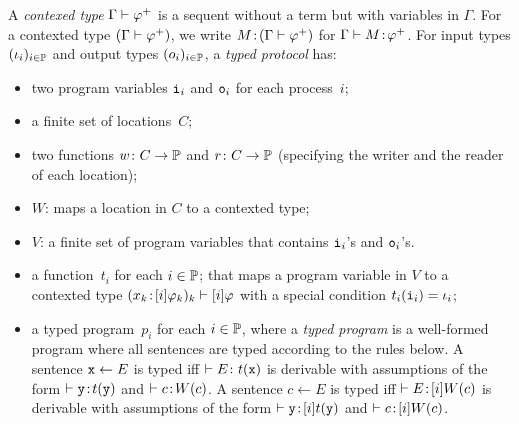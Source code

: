 A \textit{contexed type}
 $\Gamma\vdash{\varphi}^+$ is a sequent without a term but with variables in
 $\Gamma$.
For a contexted type $(\Gamma\vdash{\varphi}^+)$,
we write ${M} \mathord{\colon\kern -2pt}{(\Gamma\vdash{\varphi}^+)}$ for
$\Gamma\vdash{M} \mathord{\colon\kern -2pt}{{\varphi}^+}$.
For input types $(\iota_i)_{i\in\mathbb{P}}$
and output types $(o_i)_{i\in\mathbb{P}}$,
a \textit{typed protocol} has:
\begin{itemize}
 \item two program variables
      $\texttt{i}_i$ and $\texttt{o}_i$ for each process~$i$;
 \item a finite set of locations~$C$;
 \item two functions $w\colon C\rightarrow \mathbb{P}$
       and $r\colon C\rightarrow
       \mathbb{P}$ (specifying the writer and the reader of
       each location);
 \item $W$: maps a location in $C$ to a contexted type;
 \item $V$: a finite set of program variables that contains $\texttt{i}_i$'s
       and $\texttt{o}_i$'s.
 \item a function~$t_i$ for each $i\in \mathbb{P}$;
       that maps a program variable in $V$ to a contexted type
       $({x_k} \mathord{\colon\kern -2pt}{[i]\varphi_k})_k \vdash[i]\varphi$ with a special condition
       $t_i(\texttt{i}_i)= \iota_i$;
 \item a typed program~$p_i$ for each $i\in \mathbb{P}$, where
       a \textit{typed program} is a well-formed
       program where all
       sentences are typed according to the rules below.
       A sentence $\texttt{x} \leftarrow E$ is typed  iff $\vdash E\colon t(\texttt{x})$ is derivable with assumptions of the form $\vdash{\texttt{y}} \mathord{\colon\kern -2pt}{t(\texttt{y})}$ and $\vdash{c} \mathord{\colon\kern -2pt}{W(c)}$.
       A sentence $c\leftarrow E$ is typed iff
       $\vdash{E} \mathord{\colon\kern -2pt}{[i]W(c)}$ is derivable with
       assumptions of the form $\vdash{\texttt{y}} \mathord{\colon\kern -2pt}{[i]t(\texttt{y})}$ and
       $\vdash{c} \mathord{\colon\kern -2pt}{[i]W(c)}$.
\end{itemize}
